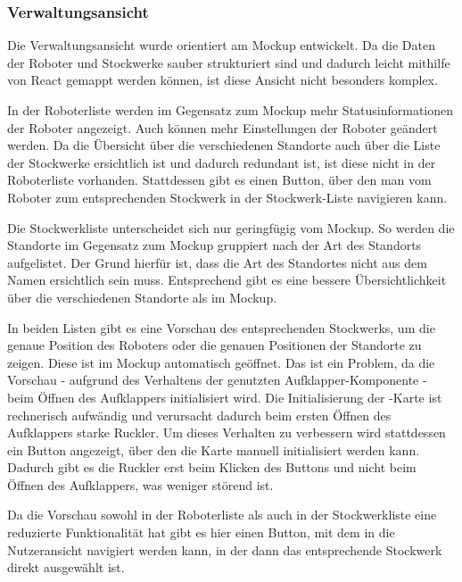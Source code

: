 \subsubsection{Verwaltungsansicht}
Die Verwaltungsansicht wurde orientiert am Mockup entwickelt. Da die Daten der Roboter und Stockwerke sauber strukturiert sind und dadurch leicht mithilfe von React gemappt werden können, ist diese Ansicht nicht besonders komplex.

In der Roboterliste werden im Gegensatz zum Mockup mehr Statusinformationen der Roboter angezeigt. Auch können mehr Einstellungen der Roboter geändert werden. Da die Übersicht über die verschiedenen Standorte auch über die Liste der Stockwerke ersichtlich ist und dadurch redundant ist, ist diese nicht in der Roboterliste vorhanden. Stattdessen gibt es einen Button, über den man vom Roboter zum entsprechenden Stockwerk in der Stockwerk-Liste navigieren kann.

Die Stockwerkliste unterscheidet sich nur geringfügig vom Mockup. So werden die Standorte im Gegensatz zum Mockup gruppiert nach der Art des Standorts aufgelistet. Der Grund hierfür ist, dass die Art des Standortes nicht aus dem Namen ersichtlich sein muss. Entsprechend gibt es eine bessere Übersichtlichkeit über die verschiedenen Standorte als im Mockup.

In beiden Listen gibt es eine Vorschau des entsprechenden Stockwerks, um die genaue Position des Roboters oder die genauen Positionen der Standorte zu zeigen. Diese ist im Mockup automatisch geöffnet. Das ist ein Problem, da die Vorschau - aufgrund des Verhaltens der genutzten Aufklapper-Komponente - beim Öffnen des Aufklappers initialisiert wird. Die Initialisierung der \deckgl{}-Karte ist rechnerisch aufwändig und verursacht dadurch beim ersten Öffnen des Aufklappers starke Ruckler. Um dieses Verhalten zu verbessern wird stattdessen ein Button angezeigt, über den die Karte manuell initialisiert werden kann. Dadurch gibt es die Ruckler erst beim Klicken des Buttons und nicht beim Öffnen des Aufklappers, was weniger störend ist.

Da die Vorschau sowohl in der Roboterliste als auch in der Stockwerkliste eine reduzierte Funktionalität hat gibt es hier einen Button, mit dem in die Nutzeransicht navigiert werden kann, in der dann das entsprechende Stockwerk direkt ausgewählt ist.

